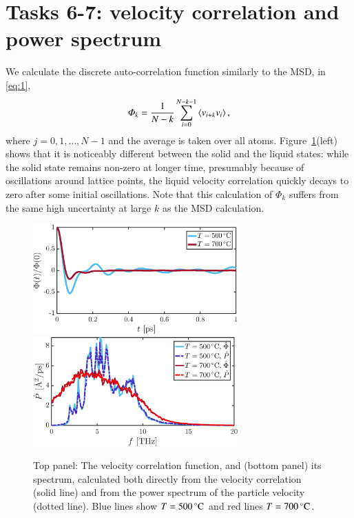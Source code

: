 \section*{Tasks 6-7: velocity correlation and power spectrum}

We calculate the discrete auto-correlation function similarly to the MSD, in \eqref{eq:1}, 
\begin{equation}
\varPhi_k = \frac{1}{N-k}\sum_{i=0}^{N-k-1} \ev{v_{i+k}v_{i}}, \label{eq:Phi}
\end{equation}
where $j=0,1,\ldots,N-1$ and the average is taken over all atoms. Figure~\ref{fig:spectrum}(left) shows that it is noticeably different between the solid and the liquid states: while the solid state remains non-zero at longer time, presumably because of oscillations around lattice points, the liquid velocity correlation quickly decays to zero after some initial oscillations. Note that this calculation of $\varPhi_k$ suffers from the same high uncertainty at large $k$ as the MSD calculation.

\begin{figure}[!ht]
\begin{center}
  \includegraphics[width=0.7\textwidth]{../figures/Phi-t} \\
    \includegraphics[width=0.7\textwidth]{../figures/P-freq} 
  \caption{Top panel: The velocity correlation function, and (bottom panel) its spectrum, calculated both directly from the velocity correlation (solid line) and from the power spectrum of the particle velocity (dotted line). Blue lines show $T=\unit[500]{^\circ C}$ and red lines $T=\unit[700]{^\circ C}$.   
  }
  \label{fig:spectrum}
\end{center}
\end{figure}


